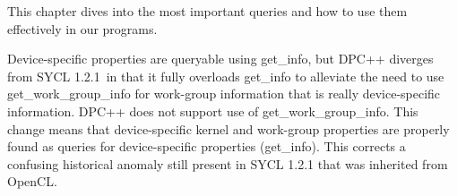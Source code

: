 This chapter dives into the most important queries and how to use them effectively in our programs.\par

Device-specific properties are queryable using get\_info, but DPC++ diverges from SYCL 1.2.1 in that it fully overloads get\_info to alleviate the need to use get\_work\_group\_info for work-group information that is really device-specific information. DPC++ does not support use of get\_work\_group\_info. This change means that device-specific kernel and work-group properties are properly found as queries for device-specific properties (get\_info). This corrects a confusing historical anomaly still present in SYCL 1.2.1 that was inherited from OpenCL.\par

















































